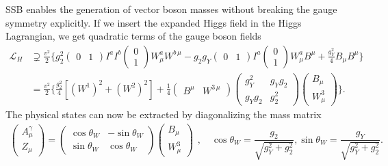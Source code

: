 \acs{SSB} enables the generation of vector boson masses without breaking the gauge symmetry explicitly. If we insert the expanded Higgs field in the Higgs Lagrangian, we get quadratic terms of the gauge boson fields
\begin{equation}
\begin{split}
\mathcal{L}_H &\supsetneq \frac{v^2}{2} \bigg \lbrace g_2^2 \begin{pmatrix} 0 & 1 \end{pmatrix} I^a I^b \begin{pmatrix} 0 \\ 1 \end{pmatrix} W^a_\mu W^{b\, \mu} - g_2 g_Y \begin{pmatrix} 0 & 1 \end{pmatrix} I^a \begin{pmatrix} 0 \\ 1 \end{pmatrix} W_\mu^a B^\mu + \frac{g_Y^2}{4} B_\mu B^\mu \bigg \rbrace \\
&= \frac{v^2}{2} \bigg \lbrace \frac{g_2^2}{4} \left[ (W^1)^2 + (W^2)^2 \right] + \frac{1}{4} \begin{pmatrix} B^\mu & W^{3\, \mu} \end{pmatrix} \begin{pmatrix}  g_Y^2 & g_Y g_2 \\ g_Y g_2 & g_2^2 \end{pmatrix} \begin{pmatrix} B_\mu \\ W^3_\mu \end{pmatrix} \bigg \rbrace.
\end{split}
\end{equation}
The physical states can now be extracted by diagonalizing the mass matrix
\begin{equation}
\begin{gathered}
\begin{pmatrix}
A^\gamma_\mu \\
Z_\mu
\end{pmatrix} = \begin{pmatrix}
\cos \theta_W & - \sin \theta_W \\
\sin \theta_W & \cos \theta_W
\end{pmatrix} \begin{pmatrix}
B_\mu \\
W_\mu^3
\end{pmatrix}
\end{gathered}, \quad \cos \theta_W = \frac{g_2}{\sqrt{g_Y^2 + g_2^2}}, \sin \theta_W = \frac{g_Y}{\sqrt{g_Y^2 + g_2^2}}.
\end{equation}

